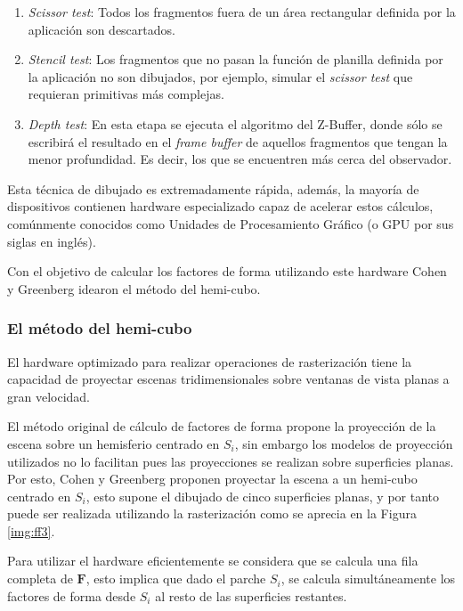 \begin{enumerate}
\begin{enumerate}
			\item \textit{Scissor test}: Todos los fragmentos fuera de un área rectangular definida por la aplicación son descartados.
			\item \textit{Stencil test}: Los fragmentos que no pasan la función de planilla definida por la aplicación no son dibujados, por ejemplo, simular el \textit{scissor test} que requieran primitivas más complejas.
			\item \textit{Depth test}: En esta etapa se ejecuta el algoritmo del Z-Buffer, donde sólo se escribirá el resultado en el \textit{frame buffer} de aquellos fragmentos que tengan la menor profundidad. Es decir, los que se encuentren más cerca del observador.
		\end{enumerate}
\end{enumerate}

Esta técnica de dibujado es extremadamente rápida, además, la mayoría de dispositivos contienen hardware especializado capaz de acelerar estos cálculos, comúnmente conocidos como Unidades de Procesamiento Gráfico (o GPU por sus siglas en inglés).

Con el objetivo de calcular los factores de forma utilizando este hardware Cohen y Greenberg \cite{Cohen} idearon el método del hemi-cubo.

\subsubsection{El método del hemi-cubo}

El hardware optimizado para realizar operaciones de rasterización tiene la capacidad de proyectar escenas tridimensionales sobre ventanas de vista planas a gran velocidad. 

El método original de cálculo de factores de forma propone la proyección de la escena sobre un hemisferio centrado en $S_{i}$, sin embargo los modelos de proyección utilizados no lo facilitan pues las proyecciones se realizan sobre superficies planas. Por esto, Cohen y Greenberg \cite{Cohen} proponen proyectar la escena a un hemi-cubo centrado en $S_{i}$, esto supone el dibujado de cinco superficies planas, y por tanto puede ser realizada utilizando la rasterización como se aprecia en la Figura \ref{img:ff3}.

Para utilizar el hardware eficientemente se considera que se calcula una fila completa de $\mathbf{F}$, esto implica que dado el parche $S_{i}$, se calcula simultáneamente los factores de forma desde $S_{i}$ al resto de las superficies restantes. 

